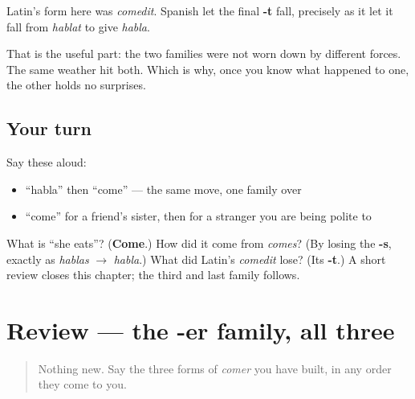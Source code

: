 \begin{cousinweb}
Latin's form here was \emph{comedit}. Spanish let the final \textbf{-t} fall, precisely as it let it fall from \emph{hablat} to give \emph{habla}.

That is the useful part: the two families were not worn down by different forces. The same weather hit both. Which is why, once you know what happened to one, the other holds no surprises.
\end{cousinweb}

\subsection*{Your turn}
Say these aloud:

\begin{itemize}
\raggedright
  \item \textquotedblleft{}habla\textquotedblright{} then \textquotedblleft{}come\textquotedblright{} — the same move, one family over
  \item \textquotedblleft{}come\textquotedblright{} for a friend's sister, then for a stranger you are being polite to
\end{itemize}

\begin{tcolorbox}[breakable,colback=teal!4,colframe=teal!35!black,title={Before you move on}]
What is \textquotedblleft{}she eats\textquotedblright{}? (\textbf{Come}.) How did it come from \emph{comes}? (By losing the \textbf{-s}, exactly as \emph{hablas} $\to$ \emph{habla}.) What did Latin's \emph{comedit} lose? (Its \textbf{-t}.) A short review closes this chapter; the third and last family follows.
\end{tcolorbox}
\section[Practice]{Review — the -er family, all three}

\label{lesson:ES-C07-repaso-comer}



\begin{quote}
Nothing new. Say the three forms of \emph{comer} you have built, in any order they come to you.
\end{quote}

